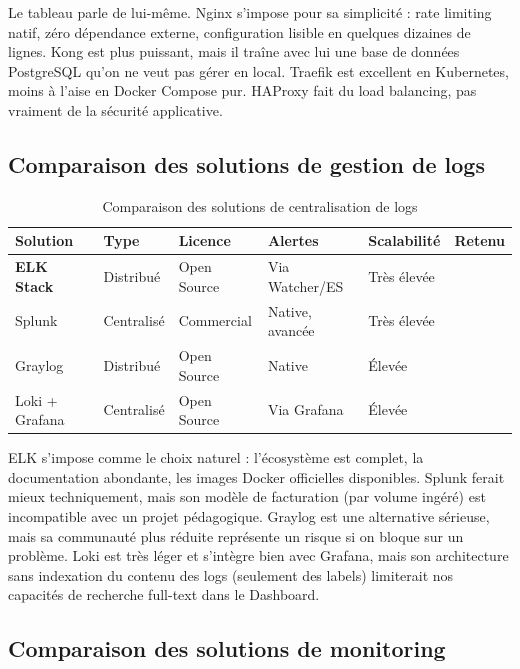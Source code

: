 \documentclass[12pt, a4paper]{report}
\newcommand{\cmark}{\ding{51}}
\newcommand{\xmark}{\ding{55}}
\begin{document}
\medskip
Le tableau parle de lui-même. Nginx s'impose pour sa simplicité : rate limiting natif, zéro dépendance externe, configuration lisible en quelques dizaines de lignes. Kong est plus puissant, mais il traîne avec lui une base de données PostgreSQL qu'on ne veut pas gérer en local. Traefik est excellent en Kubernetes, moins à l'aise en Docker Compose pur. HAProxy fait du load balancing, pas vraiment de la sécurité applicative.

\subsection{Comparaison des solutions de gestion de logs}

\begin{table}[H]
  \centering
  \caption{Comparaison des solutions de centralisation de logs}
  \begin{tabularx}{\textwidth}{@{}lXXXXX@{}}
    \toprule
    \textbf{Solution} & \textbf{Type} & \textbf{Licence} & \textbf{Alertes} & \textbf{Scalabilité} & \textbf{Retenu} \\
    \midrule
    \textbf{ELK Stack} & Distribué & Open Source & Via Watcher/ES & Très élevée & \cmark \\
    Splunk             & Centralisé & Commercial  & Native, avancée  & Très élevée & \xmark \\
    Graylog            & Distribué  & Open Source & Native           & Élevée      & \xmark \\
    Loki + Grafana     & Centralisé & Open Source & Via Grafana      & Élevée      & \xmark \\
    \bottomrule
  \end{tabularx}
\end{table}

\medskip
ELK s'impose comme le choix naturel : l'écosystème est complet, la documentation abondante, les images Docker officielles disponibles. Splunk ferait mieux techniquement, mais son modèle de facturation (par volume ingéré) est incompatible avec un projet pédagogique. Graylog est une alternative sérieuse, mais sa communauté plus réduite représente un risque si on bloque sur un problème. Loki est très léger et s'intègre bien avec Grafana, mais son architecture sans indexation du contenu des logs (seulement des labels) limiterait nos capacités de recherche full-text dans le Dashboard.

\subsection{Comparaison des solutions de monitoring}
\end{document}
